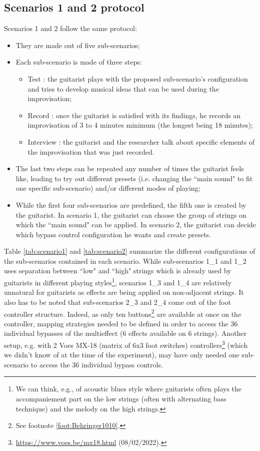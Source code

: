 \documentclass{article}
\begin{document}
\subsection{Scenarios 1 and 2 protocol}
Scenarios 1 and 2 follow the same protocol: 
\begin{itemize}
    \item They are made out of five sub-scenarios;
    \item Each sub-scenario is made of three steps: 
    \begin{itemize}
        \item Test : the guitarist plays with the proposed sub-scenario's configuration and tries to develop musical ideas that can be used during the improvisation;
        \item Record : once the guitarist is satisfied with its findings, he records an improvisation of 3 to 4 minutes minimum (the longest being 18 minutes);
        \item Interview : the guitarist and the researcher talk about specific elements of the improvisation that was just recorded.
    \end{itemize}
    \item The last two steps can be repeated any number of times the guitarist feels like, leading to try out different presets (i.e. changing the ``main sound" to fit one specific sub-scenario) and/or different modes of playing;
    \item While the first four sub-scenarios are predefined, the fifth one is created by the guitarist. In scenario 1, the guitarist can choose the group of strings on which the ``main sound" can be applied. In scenario 2, the guitarist can decide which bypass control configuration he wants and create presets.
\end{itemize}

Table \ref{tab:scenario1} and \ref{tab:scenario2} summarize the different configurations of the sub-scenarios contained in each scenario.
While sub-scenarios 1\_1 and 1\_2 uses separation between ``low" and ``high" strings which is already used by guitarists in different playing styles\footnote{We can think, e.g., of acoustic blues style where guitarists often plays the accompaniement part on the low strings (often with alternating bass technique) and the melody on the high strings.}, scenarios 1\_3 and 1\_4 are relatively unnatural for guitarists as effects are being applied on non-adjacent strings.
It also has to be noted that sub-scenarios 2\_3 and 2\_4 come out of the foot controller structure. Indeed, as only ten buttons\footnote{See footnote \ref{foot:Behringer1010}.} are available at once on the controller, mapping strategies needed to be defined in order to access the 36 individual bypasses of the multieffect (6 effects available on 6 strings). Another setup, e.g. with 2 Voes MX-18 (matrix of 6x3 foot switches) controllers\footnote{\url{https://www.voes.be/mx18.html} (08/02/2022).} (which we didn't know of at the time of the experiment), may have only needed one sub-scenario to access the 36 individual bypass controls.
\end{document}
